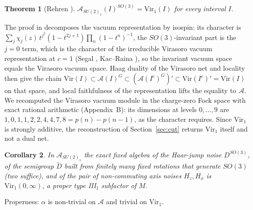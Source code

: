 \documentclass[12pt]{article}
\newtheorem{theorem}{Theorem}[section]
\newtheorem{corollary}[theorem]{Corollary}
\theoremstyle{definition}
\theoremstyle{remark}
\begin{document}
\begin{theorem}[Rehren {\cite{Rehren}}]\label{thm:Rehren}
\(\mathcal A_{SU(2)_1}(I)^{SO(3)}=\mathrm{Vir}_1(I)\) for every interval \(I\).
\end{theorem}
The proof in \cite{Rehren} decomposes the vacuum representation by isospin: its
character is \(\sum_j\chi_j(z)\,t^{j^2}(1-t^{2j+1})\prod_n(1-t^n)^{-1}\), the
\(SO(3)\)-invariant part is the \(j=0\) term, which is the character of the
irreducible Virasoro vacuum representation at \(c=1\) (Segal \cite{Segal}, Kac--Raina \cite{KR}), so the
invariant vacuum space equals the Virasoro vacuum space. Haag duality of the Virasoro net \cite{BSM} and locality then give the chain
\(\mathrm{Vir}(I)\subset\mathcal A(I)^G\subset(\mathcal A(I^c)^G)'\subset\mathrm{Vir}(I^c)'=\mathrm{Vir}(I)\)
on that space, and local faithfulness of the representation lifts the equality to
\(\mathcal A\). We recomputed the Virasoro vacuum module in the charge-zero Fock space
with exact rational arithmetic (Appendix~B): its dimensions at levels \(0,\dots,9\)
are \(1,0,1,1,2,2,4,4,7,8=p(n)-p(n-1)\), as the character requires. Since
\(\mathrm{Vir}_1\) is strongly additive, the reconstruction of Section~\ref{sec:cut}
returns \(\mathrm{Vir}_1\) itself and not a dual net.

\begin{corollary}\label{cor:selected}
In \(\mathcal A_{SU(2)_1}\) the exact fixed algebra of the Haar-jump noise
\(D^{SO(3)}\), of the semigroup \(\tilde D\) built from finitely many fixed rotations that generate \(SO(3)\) (two suffice), and of the pair of
non-commuting axis noises \(H_z,H_x\) is \(\mathrm{Vir}_1(0,\infty)\), a proper
type III\(_1\) subfactor of \(M\).
\end{corollary}
Properness: \(\alpha\) is non-trivial on \(\mathcal A\) and trivial on \(\mathrm{Vir}_1\).
\end{document}
